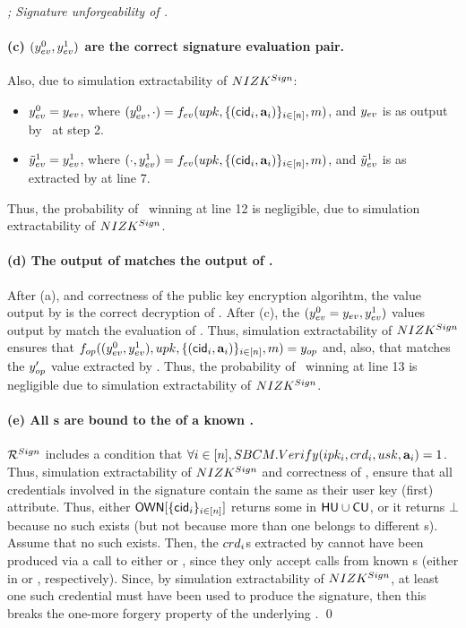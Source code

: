 \begin{proof}[; Signature unforgeability of \CUASGen]
  \paragraph{(c) $(y_{ev}^0,y_{ev}^1)$ are the correct signature evaluation
    pair.} Also, due to simulation extractability of $NIZK^{Sign}$:

  \begin{itemize}
  \item $y_{ev}^0 = y_{ev}$, where $(y_{ev}^0,\cdot) = f_{ev}(upk,\lbrace
    (\mathsf{cid}_i,\mathbf{a}_i) \rbrace_{i\in[n]},m)$, and $y_{ev}$ is as output by
    \adv~at step 2.    
  \item $\tilde{y}_{ev}^1 = y_{ev}^1$, where $(\cdot,y_{ev}^1) = f_{ev}(upk,\lbrace
    (\mathsf{cid}_i,\mathbf{a}_i)\rbrace_{i\in[n]},m)$, and $\tilde{y}_{ev}^1$ is as extracted
    by \ExtractSign at line 7.
  \end{itemize}

  Thus, the probability of \adv~winning at line 12 is negligible, due to
  simulation extractability of $NIZK^{Sign}$.

  \paragraph{(d) The output of \finsp matches the output of \Open.} %
  After (a), and correctness of the public key encryption algorihtm, the \yinsp
  value output by \Open is the correct decryption of
  \cinsp. After (c), the $(y_{ev}^0=y_{ev},y_{ev}^1)$ values output by
  \ExtractSign match the evaluation of \feval. Thus, simulation extractability
  of $NIZK^{Sign}$ ensures that $f_{op}((y_{ev}^0,y_{ev}^1),upk,\lbrace
  (\mathsf{cid}_i,\mathbf{a}_i)\rbrace_{i\in[n]},m) = y_{op}$ and, also, that \yinsp
  matches the $y_{op}'$ value extracted by \ExtractSign. Thus, the probability
  of \adv~winning at line 13 is negligible due to simulation extractability
  of $NIZK^{Sign}$.

  \paragraph{(e) All {\cred}s are bound to the \usk of a known \uid.} %
  $\mathcal{R}^{Sign}$ includes a condition that $\forall i\in[n],
  SBCM.Verify(ipk_i,crd_i,usk,\mathbf{a}_i) = 1$. Thus, simulation
  extractability of $NIZK^{Sign}$ and correctness of \SBCM, ensure that all
  credentials involved in the signature contain the same \usk as their user key
  (first) attribute. Thus, either $\mathsf{OWN}[\lbrace \mathsf{cid}_i \rbrace_{i\in[n]}]$
  returns some \uid in $\mathsf{HU} \cup \mathsf{CU}$, or it returns $\bot$ because no such
  \uid exists (but not because more than one \cid belongs to different {\uid}s).
  Assume that no such \uid exists. Then, the {$crd_i$}s extracted by
  \ExtractSign cannot have been produced via a call to either \OBTISS or \ISSUE,
  since they only accept calls from known {\uid}s (either in \HU or \CU,
  respectively). Since, by simulation extractability of $NIZK^{Sign}$, at
  least one such credential must have been used to produce the signature, then
  this breaks the one-more forgery property of the underlying \SBCM.
  \qed
\end{proof}

